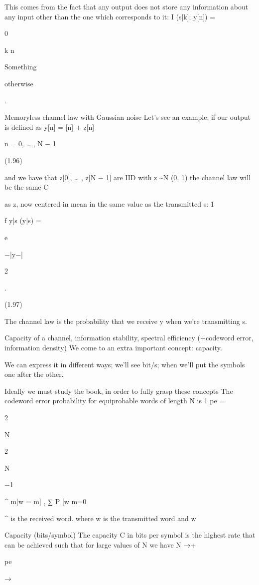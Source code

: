 This comes from the fact that any output does not store any information about any input other than the one which corresponds to it:
I (s[k]; y[n]) = {

0

k \neq n

Something

otherwise

.

Memoryless channel law with Gaussian noise Let's see an example; if our output is defined as y[n] = \sqrt{\rhos}[n] + z[n]

n = 0, … , N − 1

(1.96)

and we have that z[0], … , z[N − 1] are IID with z \sim N (0, 1) the channel law will be the same C

as z, now centered in mean in the same value as the transmitted s:
1

f y|s (y|s) =

e

−|y−\sqrt{\rhos}|

2

.

(1.97)

\pi

The channel law is the probability that we receive y when we're transmitting s.

Capacity of a channel, information stability, spectral efficiency (+codeword error, information density)
We come to an extra important concept: capacity.

We can express it in different ways; we'll see bit/s; when we'll put the symbols one after the other.

Ideally we must study the book, in order to fully grasp these concepts The codeword error probability for equiprobable words of length N is 1 pe =

2

N

2

N

−1

^ \neq m|w = m] ,
∑ P [w m=0

^ is the received word.
where w is the transmitted word and w

​Capacity (bits/symbol)
The capacity C in bits per symbol is the highest rate that can be achieved such that for large values of N we have N →+\infty

pe

→

}
